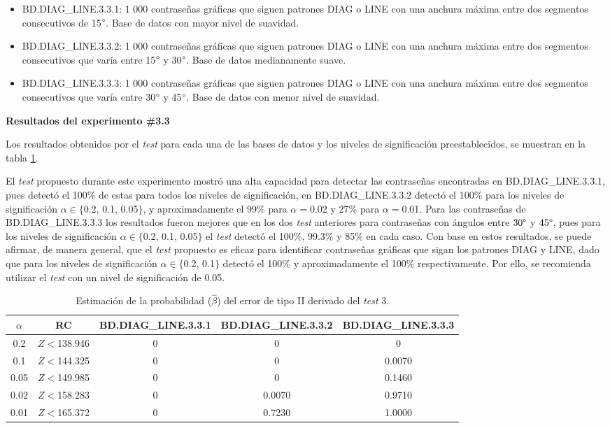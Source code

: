 \documentclass[12pt]{report}
\begin{document}
\begin{itemize}
	\item BD.DIAG\_LINE.3.3.1: 1 000 contraseñas gráficas que siguen patrones DIAG o LINE con una anchura máxima entre dos segmentos consecutivos de 15$\degree$. Base de datos con mayor nivel de suavidad. 
	\item BD.DIAG\_LINE.3.3.2: 1 000 contraseñas gráficas que siguen patrones DIAG o LINE con una anchura máxima entre dos segmentos consecutivos que varía entre 15$\degree$ y 30$\degree$. Base de datos medianamente suave.
	\item BD.DIAG\_LINE.3.3.3: 1 000 contraseñas gráficas que siguen patrones DIAG o LINE con una anchura máxima entre dos segmentos consecutivos que varía entre 30$\degree$ y 45$\degree$. Base de datos con menor nivel de suavidad.
\end{itemize}
\textbf{Resultados del experimento \#3.3}

Los resultados obtenidos por el \textit{test}  para cada una de las bases de datos y los  niveles de significación preestablecidos, se muestran en la tabla \ref{tab3:error2-prob1}.


El \textit{test} propuesto durante este experimento mostró una alta capacidad para detectar las contraseñas encontradas en BD.DIAG\_LINE.3.3.1, pues detectó el 100\% de estas para todos los niveles de significación, en BD.DIAG\_LINE.3.3.2 detectó el 100\% para los niveles de significación $\alpha \in \{$0.2, 0.1, 0.05$\}$, y aproximadamente el 99\% para $\alpha=$0.02 y 27\% para $\alpha=$0.01. Para las contraseñas de BD.DIAG\_LINE.3.3.3 los resultados fueron mejores que en los dos \textit{test} anteriores para contraseñas con ángulos entre $30\degree$ y $45\degree$, pues para los niveles de significación $\alpha \in \{$0.2, 0.1, 0.05$\}$ el \textit{test} detectó el 100\%, 99.3\% y 85\% en cada caso. Con base en estos resultados, se puede afirmar, de manera general, que el \textit{test} propuesto es eficaz para identificar contraseñas gráficas que sigan los patrones DIAG y LINE, dado que para los niveles de significación  $\alpha \in \{$0.2, 0.1$\}$ detectó el 100\% y aproximadamente el 100\% respectivamente.  Por ello, se recomienda utilizar el\textit{ test} con un nivel de significación de 0.05.
\begin{table}[h!]
	\centering
		\caption{Estimación de la probabilidad ($\hat{\beta}$) del error de tipo II derivado del \textit{test} 3.}
	\begin{tabular}{|c|c|ccc|}
		\hline
		$\alpha$&RC  &BD.DIAG\_LINE.3.3.1 & BD.DIAG\_LINE.3.3.2 & BD.DIAG\_LINE.3.3.3  \\
		\hline
		0.2 & $Z<$138.946  &0     & 0          & 0     \\
		0.1 & $Z<$144.325 &0     & 0          & 0.0070     \\
		0.05 &$Z<$149.985 &0     & 0   		& 0.1460    \\
		0.02 &$Z<$158.283 &0     & 0.0070   & 0.9710     \\
		0.01 &$Z<$165.372 &0     & 0.7230    & 1.0000     \\
		\hline
	\end{tabular}

	\label{tab3:error2-prob1}
\end{table}
\end{document}
